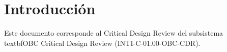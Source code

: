 \section{Introducción}
Este documento corresponde al Critical Design Review del subsistema \\textbf{OBC Critical Design Review} (INTI-C-01.00-OBC-CDR).
